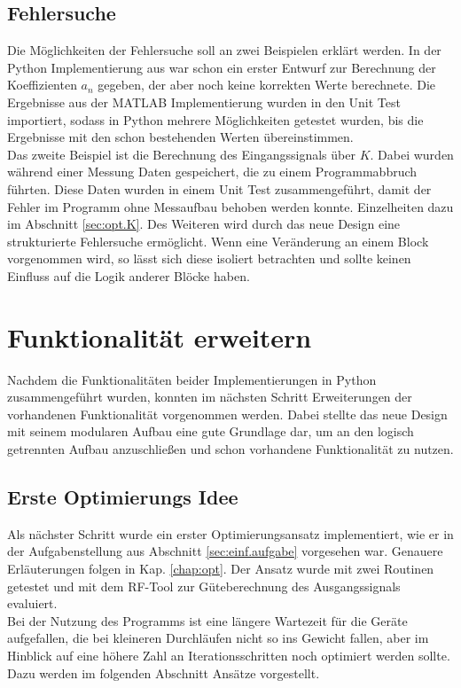 \documentclass[../Report.tex]{subfiles}
\begin{document}
\subsection*{Fehlersuche}
\label{sec:vorg.fehlersuche}
Die Möglichkeiten der Fehlersuche soll an zwei Beispielen erklärt werden. In der Python Implementierung aus \cite{PJS_Denys} war schon ein erster Entwurf zur Berechnung der Koeffizienten $a_n$ gegeben, der aber noch keine korrekten Werte berechnete. Die Ergebnisse aus der MATLAB Implementierung wurden in den Unit Test importiert, sodass in Python mehrere Möglichkeiten getestet wurden, bis die Ergebnisse mit den schon bestehenden Werten übereinstimmen. \\
Das zweite Beispiel ist die Berechnung des Eingangssignals über $K$. Dabei wurden während einer Messung Daten gespeichert, die zu einem Programmabbruch führten. Diese Daten wurden in einem Unit Test zusammengeführt, damit der Fehler im Programm ohne Messaufbau behoben werden konnte. Einzelheiten dazu im Abschnitt \ref{sec:opt.K}.
Des Weiteren wird durch das neue Design eine strukturierte Fehlersuche ermöglicht. Wenn eine Veränderung an einem Block vorgenommen wird, so lässt sich diese isoliert betrachten und sollte keinen Einfluss auf die Logik anderer Blöcke haben.

\section[Funktionalität erweitern]{Funktionalität erweitern}
\label{sec:vorg.erweiterung}
Nachdem die Funktionalitäten beider Implementierungen in Python zusammengeführt wurden, konnten im nächsten Schritt Erweiterungen der vorhandenen Funktionalität vorgenommen werden. Dabei stellte das neue Design mit seinem modularen Aufbau eine gute Grundlage dar, um an den logisch getrennten Aufbau anzuschließen und schon vorhandene Funktionalität zu nutzen.
\subsection{Erste Optimierungs Idee}
\label{sec:vorg.optimierung}
Als nächster Schritt wurde ein erster Optimierungsansatz implementiert, wie er in der Aufgabenstellung aus Abschnitt \ref{sec:einf.aufgabe} vorgesehen war. Genauere Erläuterungen folgen in Kap. \ref{chap:opt}. Der Ansatz wurde mit zwei Routinen getestet und mit dem RF-Tool \cite{RF-Tool} zur Güteberechnung des Ausgangssignals evaluiert. \\
Bei der Nutzung des Programms ist eine längere Wartezeit für die Geräte aufgefallen, die bei kleineren Durchläufen nicht so ins Gewicht fallen, aber im Hinblick auf eine höhere Zahl an Iterationsschritten noch optimiert werden sollte. Dazu werden im folgenden Abschnitt Ansätze vorgestellt.
\end{document}
